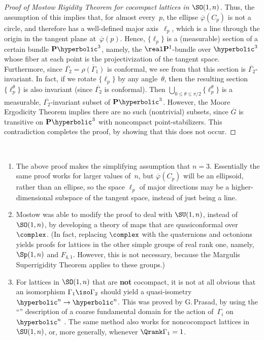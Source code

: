 \begin{proof}[Proof  of Mostow Rigidity Theorem for cocompact lattices in $\SO(1,n)$]
Thus, the assumption of this  implies that, for almost every~$p$, the ellipse $\overline\varphi(C_p)$ is not a circle, and therefore has a well-defined major axis~$\ell_p$, which is a line through the origin in the tangent plane at~$\overline\varphi(p)$. Hence, $\{\ell_p\}$ is a (measurable) section of a certain bundle $\mathbf{P}\hyperbolic^3$, namely, the $\real \mathbf{P}^1$-bundle over $\hyperbolic^3$ whose fiber at each point is the projectivization of the tangent space. Furthermore, since $\overline{\Gamma_2} = \overline{\rho(\Gamma_1)}$ is conformal, we see from  that this section is $\overline{\Gamma_2}$-invariant. In fact, if we rotate $\{\ell_p\}$ by any angle~$\theta$, then the resulting section $\{\ell_p^\theta\}$  is also invariant (since $\overline{\Gamma_2}$ is conformal). Then $\bigcup_{0 \le \theta \le \pi/2} \{\ell_p^\theta\}$ is a measurable, $\overline{\Gamma_2}$-invariant subset of $\mathbf{P}\hyperbolic^3$. However, the Moore Ergodicity Theorem  implies there are no such (nontrivial) subsets, since $\overline{G}$ is transitive on $\mathbf{P}\hyperbolic^3$ with noncompact point-stabilizers. This contradiction completes the proof, by showing that this  does not occur.
\end{proof}

\begin{rems} \label{MostowPfRems} \ 
\noprelistbreak
	\begin{enumerate}
	\item The above proof makes the simplifying assumption that $n = 3$. Essentially the same proof works for larger values of~$n$, but $\overline\varphi(C_p)$ will be an ellipsoid, rather than an ellipse, so the space $\ell_p$ of major directions may be a higher-dimensional subspace of the tangent space, instead of just being a line.

	\item \label{MostowPfRems-QuasiC}
	Mostow was able to modify the proof to deal with $\SU(1,n)$, instead of $\SO(1,n)$, by developing a theory of  maps that are quasiconformal over~$\complex$. (In fact, replacing $\complex$ with the quaternions and octonions yields proofs for lattices in  the other simple groups of real rank one, namely, $\Sp(1,n)$ and $F_{4,1}$. However, this is not necessary, because the Margulis Superrigidity Theorem applies to these groups.)

	\item \label{MostowPfRems-Qrank1}
	For lattices in $\SO(1,n)$ that are \textbf{not} cocompact, it is not at all obvious that an isomorphism $\Gamma_1 \iso \Gamma_2$ should yield a quasi-isometry $\hyperbolic^n \to \hyperbolic^n$. This was proved by G.\,Prasad, by using the ``'' description of a coarse fundamental domain for the action of~$\Gamma_i$ on $\hyperbolic^n$ . 
	The same method also works for noncocompact lattices in $\SU(1,n)$, or, more generally, whenever $\Qrank \Gamma_1 = 1$.
	\end{enumerate}
\end{rems}

